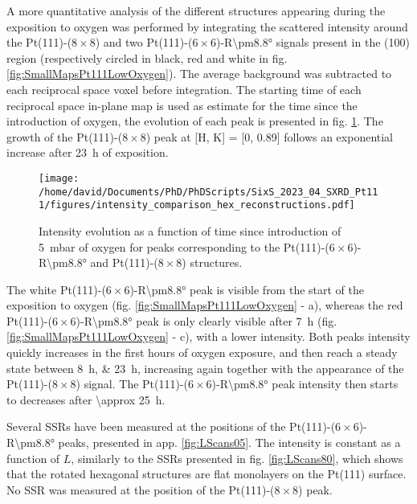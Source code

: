 A more quantitative analysis of the different structures appearing during the exposition to oxygen was performed by integrating the scattered intensity around the Pt(111)-($8\times8$) and two Pt(111)-($6\times6$)-R\ang{\pm8.8} signals present in the (100) region (respectively circled in black, red and white in fig. \ref{fig:SmallMapsPt111LowOxygen}).
The average background was subtracted to each reciprocal space voxel before integration.
The starting time of each reciprocal space in-plane map is used as estimate for the time since the introduction of oxygen, the evolution of each peak is presented in fig. \ref{fig:HexBraggPeaks}.
The growth of the Pt(111)-($8\times8$) peak at [H, K] = [0, 0.89] follows an exponential increase after \qty{23}{\hour} of exposition.

\begin{figure}[!htb]
    \centering
    \texttt{[image: /home/david/Documents/PhD/PhDScripts/SixS\_2023\_04\_SXRD\_Pt111/figures/intensity\_comparison\_hex\_reconstructions.pdf]}
    \caption{
        Intensity evolution as a function of time since introduction of \qty{5}{\milli\bar} of oxygen for peaks corresponding to the Pt(111)-($6\times6$)-R\ang{\pm8.8} and Pt(111)-($8\times8$) structures.
    }
    \label{fig:HexBraggPeaks}
\end{figure}

The white Pt(111)-($6\times6$)-R\ang{\pm8.8} peak is visible from the start of the exposition to oxygen (fig. \ref{fig:SmallMapsPt111LowOxygen} - a), whereas the red Pt(111)-($6\times6$)-R\ang{\pm8.8} peak is only clearly visible after \qty{7}{\hour} (fig. \ref{fig:SmallMapsPt111LowOxygen} - c), with a lower intensity.
Both peaks intensity quickly increases in the first hours of oxygen exposure, and then reach a steady state between \qtylist{8;23}{\hour}, increasing again together with the appearance of the Pt(111)-($8\times8$) signal.
The Pt(111)-($6\times6$)-R\ang{\pm8.8} peak intensity then starts to decreases after \qty{\approx 25}{\hour}.

Several SSRs have been measured at the positions of the Pt(111)-($6\times6$)-R\ang{\pm8.8} peaks, presented in app. \ref{fig:LScans05}.
The intensity is constant as a function of $L$, similarly to the SSRs presented in fig. \ref{fig:LScans80}, which shows that the rotated hexagonal structures are flat monolayers on the Pt(111) surface.
No SSR was measured at the position of the Pt(111)-($8\times8$) peak.

